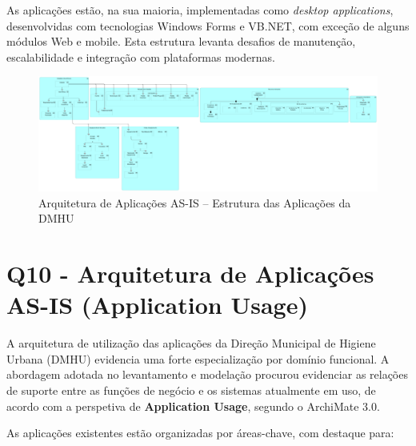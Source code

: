 \documentclass[12pt,a4paper,final]{article}
\begin{document}
    As aplicações estão, na sua maioria, implementadas como \textit{desktop applications}, desenvolvidas com tecnologias Windows Forms e VB.NET, com exceção de alguns módulos Web e mobile.
    Esta estrutura levanta desafios de manutenção, escalabilidade e integração com plataformas modernas.

    \vspace{0.5cm}
    \begin{figure}[H]
        \centering
        \includegraphics[width=\textwidth]{Q9}
        \caption{Arquitetura de Aplicações AS-IS – Estrutura das Aplicações da DMHU}
        \label{fig:q9-as-is-structure}
    \end{figure}

    \section*{Q10 - Arquitetura de Aplicações AS-IS (Application Usage)}

    A arquitetura de utilização das aplicações da Direção Municipal de Higiene Urbana (DMHU) evidencia uma forte especialização por domínio funcional. A abordagem adotada no levantamento e modelação procurou evidenciar as relações de suporte entre as funções de negócio e os sistemas atualmente em uso, de acordo com a perspetiva de \textbf{Application Usage}, segundo o ArchiMate 3.0.

    As aplicações existentes estão organizadas por áreas-chave, com destaque para:
\end{document}
